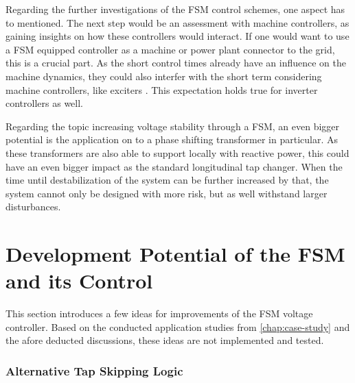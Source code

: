 Regarding the further investigations of the \acs{FSM} control schemes, one aspect has to mentioned.
The next step would be an assessment with machine controllers, as gaining insights on how these controllers would interact.
If one would want to use a \acs{FSM} equipped controller as a machine or power plant connector to the grid, this is a crucial part.
As the short control times already have an influence on the machine dynamics, they could also interfer with the short term considering machine controllers, like exciters \autocite{machowski_2020}.
This expectation holds true for inverter controllers as well.

Regarding the topic increasing voltage stability through a \acs{FSM}, an even bigger potential is the application on to a phase shifting transformer in particular.
As these transformers are also able to support locally with reactive power, this could have an even bigger impact as the standard longitudinal tap changer.
When the time until destabilization of the system can be further increased by that, the system cannot only be designed with more risk, but as well withstand larger disturbances.
    
\section{Development Potential of the FSM and its Control}
\label{sec:experimental-modeling}

This section introduces a few ideas for improvements of the \acs{FSM} voltage controller.
Based on the conducted application studies from \autoref{chap:case-study} and the afore deducted discussions, these ideas are not implemented and tested.

\subsubsection{Alternative Tap Skipping Logic}
\label{sec:modeling-alt-tap-skip}

